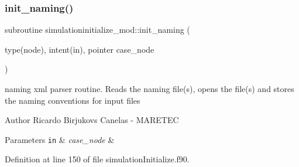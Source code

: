 \mbox{\label{namespacesimulationinitialize__mod_a4909cc4cb57549e6eed3f69d6dfa30b5}} 
\subsubsection{\texorpdfstring{init\+\_\+naming()}{init\_naming()}}
{\footnotesize\ttfamily subroutine simulationinitialize\+\_\+mod\+::init\+\_\+naming (\begin{DoxyParamCaption}\item[{type(node), intent(in), pointer}]{case\+\_\+node }\end{DoxyParamCaption})\hspace{0.3cm}{\ttfamily [private]}}



naming xml parser routine. Reads the naming file(s), opens the file(s) and stores the naming conventions for input files 

\begin{DoxyAuthor}{Author}
Ricardo Birjukovs Canelas -\/ M\+A\+R\+E\+T\+EC 
\end{DoxyAuthor}

\begin{DoxyParams}[1]{Parameters}
\mbox{\tt in}  & {\em case\+\_\+node} & \\
\hline
\end{DoxyParams}


Definition at line 150 of file simulation\+Initialize.\+f90.


